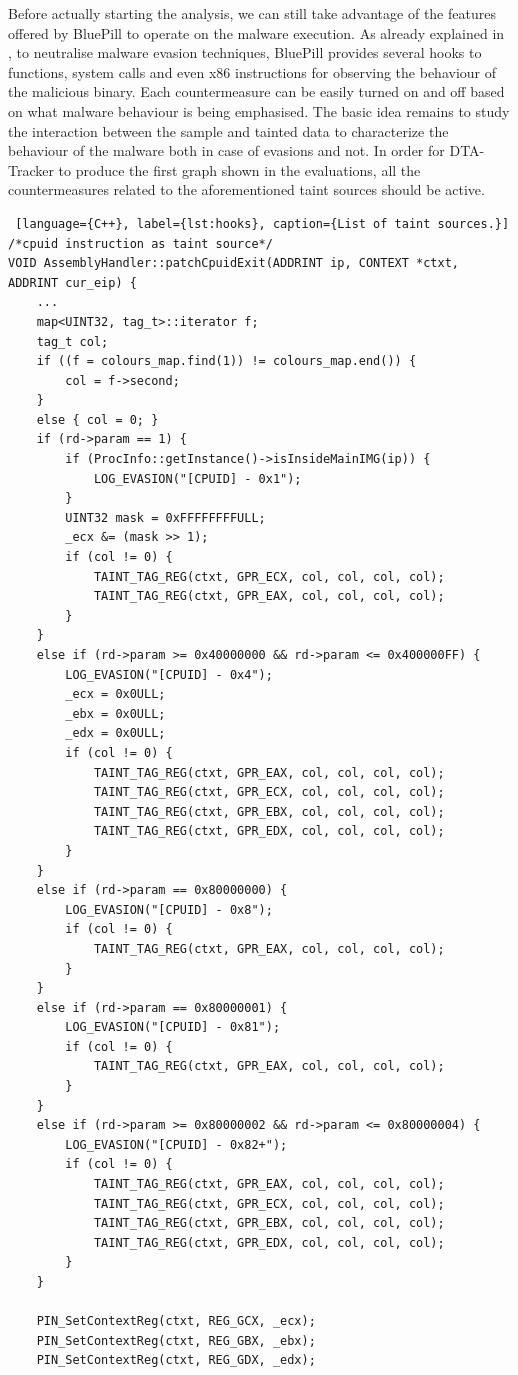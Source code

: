 \documentclass[LaM,binding=0.6cm]{sapthesis}
\begin{document}
Before actually starting the analysis, we can still take advantage of the features offered by BluePill to operate on the malware execution. As already explained in , to neutralise malware evasion techniques, BluePill provides several hooks to functions, system calls and even x$86$ instructions for observing the behaviour of the malicious binary. Each countermeasure can be easily turned on and off based on what malware behaviour is being emphasised. The basic idea remains to study the interaction between the sample and tainted data to characterize the behaviour of the malware both in case of evasions and not. In order for DTA-Tracker to produce the first graph shown in the evaluations, all the countermeasures related to the aforementioned taint sources should be active.
\begin{lstlisting} [language={C++}, label={lst:hooks}, caption={List of taint sources.}]
/*cpuid instruction as taint source*/
VOID AssemblyHandler::patchCpuidExit(ADDRINT ip, CONTEXT *ctxt, ADDRINT cur_eip) {
	...
	map<UINT32, tag_t>::iterator f;
	tag_t col;
	if ((f = colours_map.find(1)) != colours_map.end()) {
		col = f->second;
	}
	else { col = 0; }
	if (rd->param == 1) {
		if (ProcInfo::getInstance()->isInsideMainIMG(ip)) {
			LOG_EVASION("[CPUID] - 0x1");
		}
		UINT32 mask = 0xFFFFFFFFULL;
		_ecx &= (mask >> 1);
		if (col != 0) {
			TAINT_TAG_REG(ctxt, GPR_ECX, col, col, col, col);
			TAINT_TAG_REG(ctxt, GPR_EAX, col, col, col, col);
		}
	}
	else if (rd->param >= 0x40000000 && rd->param <= 0x400000FF) {
		LOG_EVASION("[CPUID] - 0x4");
		_ecx = 0x0ULL;
		_ebx = 0x0ULL;
		_edx = 0x0ULL;
		if (col != 0) {
			TAINT_TAG_REG(ctxt, GPR_EAX, col, col, col, col);
			TAINT_TAG_REG(ctxt, GPR_ECX, col, col, col, col);
			TAINT_TAG_REG(ctxt, GPR_EBX, col, col, col, col);
			TAINT_TAG_REG(ctxt, GPR_EDX, col, col, col, col);
		}
	}
	else if (rd->param == 0x80000000) {
		LOG_EVASION("[CPUID] - 0x8");
		if (col != 0) {
			TAINT_TAG_REG(ctxt, GPR_EAX, col, col, col, col);
		}
	}
	else if (rd->param == 0x80000001) {
		LOG_EVASION("[CPUID] - 0x81");
		if (col != 0) {
			TAINT_TAG_REG(ctxt, GPR_EAX, col, col, col, col);
		}
	}
	else if (rd->param >= 0x80000002 && rd->param <= 0x80000004) {
		LOG_EVASION("[CPUID] - 0x82+");
		if (col != 0) {
			TAINT_TAG_REG(ctxt, GPR_EAX, col, col, col, col);
			TAINT_TAG_REG(ctxt, GPR_ECX, col, col, col, col);
			TAINT_TAG_REG(ctxt, GPR_EBX, col, col, col, col);
			TAINT_TAG_REG(ctxt, GPR_EDX, col, col, col, col);
		}
	}

	PIN_SetContextReg(ctxt, REG_GCX, _ecx);
	PIN_SetContextReg(ctxt, REG_GBX, _ebx);
	PIN_SetContextReg(ctxt, REG_GDX, _edx);


\end{lstlisting}
\end{document}
